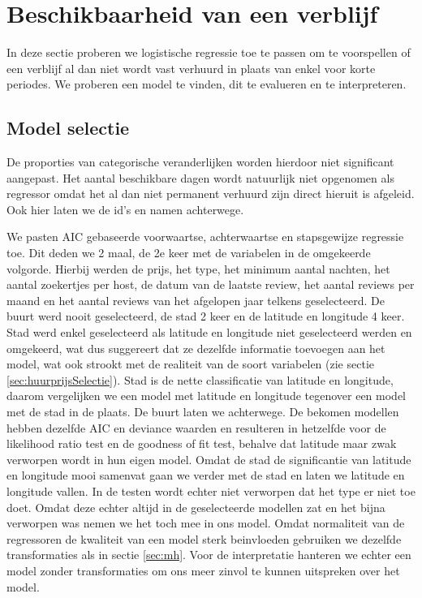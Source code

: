 \documentclass[a4paper,kulak]{kulakarticle} %
\begin{document}
\section{Beschikbaarheid van een verblijf}
In deze sectie proberen we logistische regressie toe te passen om te voorspellen of een verblijf al dan niet wordt vast verhuurd in plaats van enkel voor korte periodes.
We proberen een model te vinden, dit te evalueren en te interpreteren.
\subsection{Model selectie}
De proporties van categorische veranderlijken worden hierdoor niet significant aangepast.
Het aantal beschikbare dagen wordt natuurlijk niet opgenomen als regressor omdat het al dan niet permanent verhuurd zijn direct hieruit is afgeleid. Ook hier laten we de id's en namen achterwege.


We pasten AIC gebaseerde voorwaartse, achterwaartse en stapsgewijze regressie toe.
Dit deden we 2 maal, de 2e keer met de variabelen in de omgekeerde volgorde.
Hierbij werden de prijs, het type, het minimum aantal nachten, het aantal zoekertjes per host, de datum van de laatste review, het aantal reviews per maand en het aantal reviews van het afgelopen jaar telkens geselecteerd.
De buurt werd nooit geselecteerd, de stad 2 keer en de latitude en longitude 4 keer. Stad werd enkel geselecteerd als latitude en longitude niet geselecteerd werden en omgekeerd, wat dus suggereert dat ze dezelfde informatie toevoegen aan het model, wat ook strookt met de realiteit van de soort variabelen (zie sectie \ref{sec:huurprijsSelectie}).
Stad is de nette classificatie van latitude en longitude, daarom vergelijken we een model met latitude en longitude tegenover een model met de stad in de plaats.
De buurt laten we achterwege.
De bekomen modellen hebben dezelfde AIC en deviance waarden en resulteren in hetzelfde voor de likelihood ratio test en de goodness of fit test, behalve dat latitude maar zwak verworpen wordt in hun eigen model.
Omdat de stad de significantie van latitude en longitude mooi samenvat gaan we verder met de stad en laten we latitude en longitude vallen.  
In de testen wordt echter niet verworpen dat het type er niet toe doet.
Omdat deze echter altijd in de geselecteerde modellen zat en het bijna verworpen was nemen we het toch mee in ons model.
Omdat normaliteit van de regressoren de kwaliteit van een model sterk beinvloeden gebruiken we dezelfde transformaties als in sectie \ref{sec:mh}.
Voor de interpretatie hanteren we echter een model zonder transformaties om ons meer zinvol te kunnen uitspreken over het model. 
\end{document}
